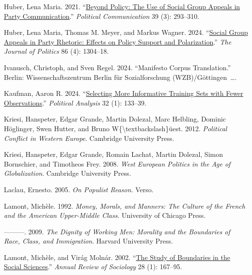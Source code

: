 \documentclass[12pt]{article}
\newlength{\cslhangindent}
\newenvironment{CSLReferences}[2]
  {\begin{list}{}{%
    \setlength{\itemindent}{0pt}
    \setlength{\leftmargin}{0pt}
    \setlength{\parsep}{0pt}
    \ifodd #1
      \setlength{\leftmargin}{\cslhangindent}
      \setlength{\itemindent}{-\cslhangindent}
    \fi
    \setlength{\itemsep}{#2\baselineskip}}}
  {\end{list}}
\begin{document}
\begin{CSLReferences}{1}{0}
Huber, Lena Maria. 2021. {``\href{https://doi.org/10.1080/10584609.2021.1998264}{Beyond Policy: The Use of Social Group Appeals in Party Communication}.''} \emph{Political Communication} 39 (3): 293--310.

Huber, Lena Maria, Thomas M. Meyer, and Markus Wagner. 2024. {``\href{https://doi.org/10.1086/729946}{Social Group Appeals in Party Rhetoric: Effects on Policy Support and Polarization}.''} \emph{The Journal of Politics} 86 (4): 1304--18.

Ivanusch, Christoph, and Sven Regel. 2024. {``Manifesto Corpus Translation.''} Berlin: Wissenschaftszentrum Berlin f{ü}r Sozialforschung (WZB)/G{ö}ttingen~\ldots.

Kaufman, Aaron R. 2024. {``\href{https://www.cambridge.org/core/journals/political-analysis/article/selecting-more-informative-training-sets-with-fewer-observations/FCC76C9F7A5B27D00B0C9BE023BF84E7}{Selecting More Informative Training Sets with Fewer Observations}.''} \emph{Political Analysis} 32 (1): 133--39.

Kriesi, Hanspeter, Edgar Grande, Martin Dolezal, Marc Helbling, Dominic Höglinger, Swen Hutter, and Bruno W\{\textbackslash textbackslash\}üest. 2012. \emph{Political Conflict in Western Europe}. Cambridge University Press.

Kriesi, Hanspeter, Edgar Grande, Romain Lachat, Martin Dolezal, Simon Bornschier, and Timotheos Frey. 2008. \emph{West European Politics in the Age of Globalization}. Cambridge University Press.

Laclau, Ernesto. 2005. \emph{On Populist Reason}. Verso.

Lamont, Michèle. 1992. \emph{Money, Morals, and Manners: The Culture of the French and the American Upper-Middle Class}. University of Chicago Press.

---------. 2009. \emph{The Dignity of Working Men: Morality and the Boundaries of Race, Class, and Immigration}. Harvard University Press.

Lamont, Michèle, and Virág Molnár. 2002. {``\href{https://doi.org/10.1146/annurev.soc.28.110601.141107}{The Study of Boundaries in the Social Sciences}.''} \emph{Annual Review of Sociology} 28 (1): 167--95.


\end{CSLReferences}
\end{document}
